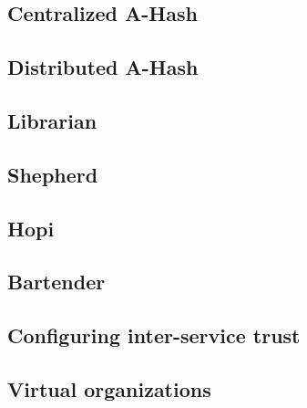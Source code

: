\documentclass{book}
\begin{document}

\subsection{Centralized A-Hash} %
\label{sub:centralized_a_hash}


\subsection{Distributed A-Hash} %
\label{sub:distributed_a_hash}


\subsection{Librarian} %
\label{sub:librarian}


\subsection{Shepherd} %
\label{sub:shepherd}


\subsection{Hopi} %
\label{sub:hopi}


\subsection{Bartender} %
\label{sub:bartender}


\subsection{Configuring inter-service trust} %
\label{sub:configuring_inter_service_trust}


\subsection{Virtual organizations} %
\label{sub:virtual_organizations}
\end{document}
